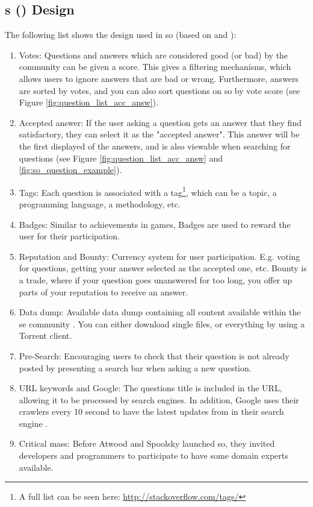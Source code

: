 \subsection[Stack Overflows design]{s () Design}
\label{sec:stackoverflow_design}
The following list shows the design used in \gls{so} (based on \textcite[p.~6-7]{M.Sewak2010} and \textcite[p.~805]{Treude2011}):
\begin{enumerate}
	\item Votes: Questions and answers which are considered good (or bad) by the community can be given a score. 
	This gives a filtering mechanisms, which allows users to ignore answers that are bad or wrong. 
	Furthermore, answers are sorted by votes, and you can also sort questions on \gls{so} by vote score 
	(see Figure \ref{fig:question_list_acc_answ}). 
	\item Accepted answer: If the user asking a question gets an answer that they find satisfactory, they can select it as the "accepted answer". 
	This answer will be the first displayed of the answers, and is also viewable when searching for questions 
	(see Figure \ref{fig:question_list_acc_answ} and \ref{fig:so_question_example}).
	\item Tags: Each question is associated with a tag\footnote{
		A full list can be seen here: \url{http://stackoverflow.com/tags/}
	}, which can be a topic, a programming language, a methodology, etc.
	\item Badges: Similar to achievements in games, Badges are used to reward the user for their participation.
	\item Reputation and Bounty: Currency system for user participation. 
	E.g. voting for questions, getting your answer selected as the accepted one, etc.
	Bounty is a trade, where if your question goes unanswered for too long, you offer up parts of your reputation to receive an answer.
	\item Data dump: Available data dump containing all content available within the \gls{se} community \cite{StackExchange2016}. 
	You can either download single files, or everything by using a Torrent client.
	\item Pre-Search: Encouraging users to check that their question is not already posted by presenting a search bar when asking a new question. 
	\item URL keywords and Google: The questions title is included in the URL, allowing it to be processed by search engines. 
	In addition, Google uses their crawlers every 10 second to have the latest updates from  in their search engine \cite{Gobry2011}.
	\item Critical mass: Before Atwood and Spoolsky launched \gls{so}, they invited developers and programmers to participate to have some domain experts available. 
\end{enumerate}

